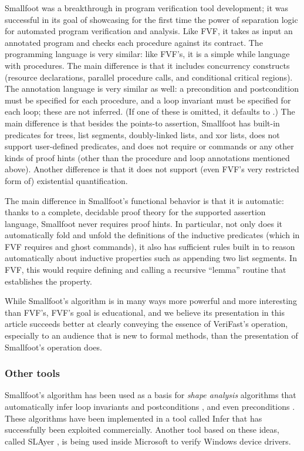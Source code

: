 \documentclass{CSML}
\theoremstyle{definition}\newtheorem{notation}[thm]{Notation}
\theoremstyle{plain}\newtheorem{satz}[thm]{Satz}
\begin{document}
Smallfoot \cite{smallfoot2006} was a breakthrough in program verification tool development;
it was successful in its goal of showcasing for the first time the power of separation logic for automated program verification and analysis.
Like FVF, it takes as input an annotated program and checks each procedure
against its contract. The programming language is very similar: like FVF's, it is a simple while language with
procedures. The main difference is that it
includes concurrency constructs (resource declarations, parallel procedure calls, and conditional critical regions).
The annotation language is very similar as well: a precondition and postcondition must
be specified for each procedure, and a loop invariant must be specified for each loop; these are not inferred.
(If one of these is omitted, it defaults to .)
The main difference is that besides the points-to assertion, Smallfoot has built-in predicates for trees, list segments, doubly-linked lists, and xor lists,
does not support user-defined predicates, and does not require  or  commands or any other kinds of proof hints (other than the procedure
and loop annotations mentioned above). Another difference is that it does not support (even FVF's very restricted form of) existential quantification.

The main difference in Smallfoot's functional behavior is that it is automatic: thanks to a complete, decidable proof theory for the supported assertion language,
Smallfoot never requires proof hints. In particular, not only does it automatically fold and unfold the definitions of the inductive predicates
(which in FVF requires  and  ghost commands),
it also has sufficient rules built in to reason automatically about inductive properties such as appending two list segments.
In FVF, this would require defining and calling a recursive ``lemma'' routine that establishes the property.

While Smallfoot's algorithm is in many ways more powerful and more interesting than FVF's, FVF's goal is educational,
and we believe its presentation in this article succeeds better at clearly conveying the essence of VeriFast's operation,
especially to an audience that is new to formal methods,
than the presentation of Smallfoot's operation \cite{smallfoot2006,smallfoot-symbex} does.


\subsubsection{Other tools}

Smallfoot's algorithm has been used as a basis for \emph{shape analysis} algorithms that automatically infer loop invariants and postconditions \cite{distefano-tacas2006},
and even preconditions \cite{DBLP:conf/popl/CalcagnoDOY09}.
These algorithms have been implemented in a tool called Infer \cite{infer} that has successfully been exploited commercially.
Another tool based on these ideas, called SLAyer \cite{slayer}, is being used inside Microsoft to verify Windows device drivers.
\end{document}
